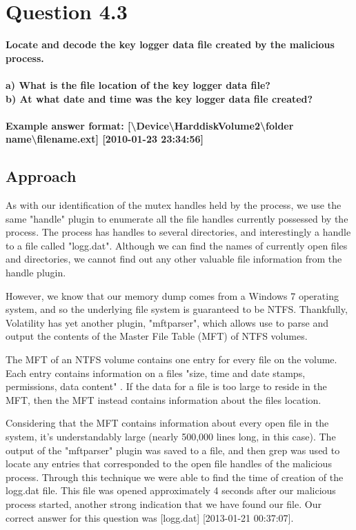 \section{Question 4.3}
\textbf{Locate and decode the key logger data file created by the malicious
process.\\
\\a) What is the file location of the key logger data file?
\\b) At what date and time was the key logger data file created?
\\\\
Example answer format:
[\textbackslash{}Device\textbackslash{}HarddiskVolume2\textbackslash{}folder
name\textbackslash{}filename.ext] [2010-01-23 23:34:56]}
\subsection{Approach}

As with our identification of the mutex handles held by the process, we use the same "handle" plugin to enumerate all the file handles currently possessed by the process. The process has handles to several directories, and interestingly a handle to a file called "logg.dat". Although we can find the names of currently open files and directories, we cannot find out any other valuable file information from the handle plugin.

However, we know that our memory dump comes from a Windows 7 operating system, and so the underlying file system is guaranteed to be NTFS. Thankfully, Volatility has yet another plugin, "mftparser", which allows use to parse and output the contents of the Master File Table (MFT) of NTFS volumes.

The MFT of an NTFS volume contains one entry for every file on the volume. Each entry contains information on a files "size, time and date stamps, permissions, data content" \cite[p.443]{winint2}. If the data for a file is too large to reside in the MFT, then the MFT instead contains information about the files location.

Considering that the MFT contains information about every open file in the system, it's understandably large (nearly 500,000 lines long, in this case). The output of the "mftparser" plugin was saved to a file, and then grep was used to locate any entries that corresponded to the open file handles of the malicious process. Through this technique we were able to find the time of creation of the logg.dat file. This file was opened approximately 4 seconds after our malicious process started, another strong indication that we have found our file. Our correct answer for this question was [logg.dat] [2013-01-21 00:37:07]. 
